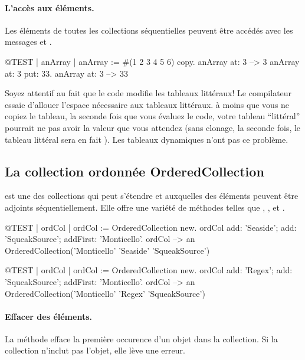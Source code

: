 \documentclass[a4paper,10pt,twoside]{book}
\begin{document}
\paragraph{L'accès aux éléments.}
Les éléments de toutes les collections séquentielles peuvent
être accédés avec les messages  et
 .

\begin{code}{@TEST | anArray |}
anArray := #(1 2 3 4 5 6) copy.
anArray at: 3 --> 3
anArray at: 3 put: 33.
anArray at: 3 --> 33
\end{code}

\noindent
Soyez attentif au fait que le code modifie les tableaux littéraux!
Le compilateur essaie d'allouer l'espace nécessaire aux tableaux littéraux.
à moins que vous ne copiez le tableau, la seconde fois que vous évaluez
le code, votre tableau ``littéral'' pourrait ne pas avoir la valeur que vous
attendez
(sans clonage, la seconde fois, le tableau littéral  sera en fait ).
Les tableaux dynamiques n'ont pas ce problème.

\subsection{La collection ordonnée OrderedCollection}
 est une des collections qui peut s'étendre
et auxquelles des éléments peuvent être adjoints séquentiellement.
Elle offre une variété de méthodes telles que , ,  et .

\if\value{seaside-chapter}
\begin{code}{@TEST | ordCol |}
ordCol := OrderedCollection new.
ordCol add: 'Seaside'; add: 'SqueakSource'; addFirst: 'Monticello'.
ordCol --> an OrderedCollection('Monticello' 'Seaside' 'SqueakSource')
\end{code}
\else
\begin{code}{@TEST | ordCol |}
ordCol := OrderedCollection new.
ordCol add: 'Regex'; add: 'SqueakSource'; addFirst: 'Monticello'.
ordCol --> an OrderedCollection('Monticello' 'Regex' 'SqueakSource')
\end{code}
\fi

\paragraph{Effacer des éléments.} La méthode   efface la première occurence d'un objet dans la collection. Si la collection n'inclut pas l'objet, elle lève une erreur.
\end{document}
